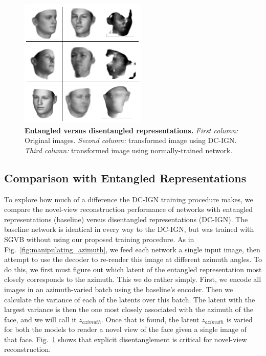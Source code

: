 \documentclass[12pt,twoside]{mitthesis}
\begin{document}
\begin{figure}[htbp]
\centering
\includegraphics{../figures/entangled-disentangled-comparison.png}
\caption{\label{fig:pose_and_entangledcomparison}\textbf{Entangled
versus disentangled representations.} \emph{First column:} Original
images. \emph{Second column:} transformed image using DC-IGN.
\emph{Third column:} transformed image using normally-trained network.}
\end{figure}

\subsection{Comparison with Entangled
Representations}\label{comparison-with-entangled-representations}

To explore how much of a difference the DC-IGN training procedure makes,
we compare the novel-view reconstruction performance of networks with
entangled representations (baseline) versus disentangled representations
(DC-IGN). The baseline network is identical in every way to the DC-IGN,
but was trained with SGVB without using our proposed training procedure.
As in Fig.~\ref{fig:manipulating_azimuth}, we feed each network a single
input image, then attempt to use the decoder to re-render this image at
different azimuth angles. To do this, we first must figure out which
latent of the entangled representation most closely corresponds to the
azimuth. This we do rather simply. First, we encode all images in an
azimuth-varied batch using the baseline's encoder. Then we calculate the
variance of each of the latents over this batch. The latent with the
largest variance is then the one most closely associated with the
azimuth of the face, and we will call it \(z_{azimuth}\). Once that is
found, the latent \(z_{azimuth}\) is varied for both the models to
render a novel view of the face given a single image of that face.
Fig.~\ref{fig:pose_and_entangledcomparison} shows that explicit
disentanglement is critical for novel-view reconstruction.
\end{document}
